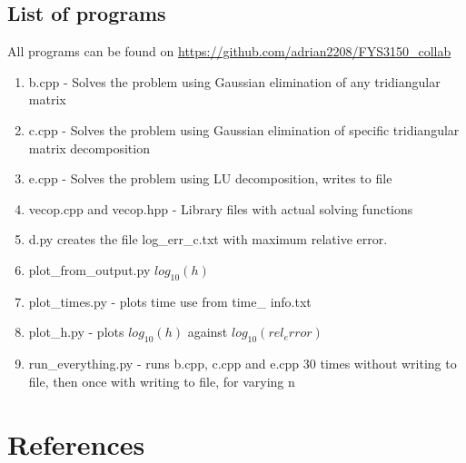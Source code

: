 \documentclass[10pt,a4paper]{article}
\begin{document}
\subsection{List of programs}
All programs can be found on \url{https://github.com/adrian2208/FYS3150_collab}
\begin{enumerate}
\item b.cpp - Solves the problem using Gaussian elimination of any tridiangular matrix
\item c.cpp - Solves the problem using Gaussian elimination of specific tridiangular matrix decomposition
\item e.cpp - Solves the problem using LU decomposition, writes to file
\item vecop.cpp and vecop.hpp - Library files with actual solving functions
\item d.py creates the file log\_err\_c.txt with maximum relative error.
\item plot\_from\_output.py $log_{10}(h)$
\item plot\_times.py - plots time use from time\_
info.txt
\item plot\_h.py - plots $log_{10}(h)$ against $log_{10}(rel_error)$
\item run\_everything.py - runs b.cpp, c.cpp and e.cpp 30 times without writing to file, then once with writing to file, for varying n
\end{enumerate}
\section{References}
 
\begin{thebibliography}{9}

\end{thebibliography}













\begin{comment}

$$
\begin{bmatrix}
0 & 0 & 0 & 0 \\
0 & 0 & 0 & 0 \\
0 & 0 & 0 & 0 \\
0 & 0 & 0 & 0 \\
\end{bmatrix}
$$

\begin{lstlisting}[caption=insert caption]
for (unsigned int i = 0; i<100;i++{
}
\end{lstlisting}

\begin{figure}[h]
\texttt{[image: ]}
\caption{include caption}
\end{figure}


HOW TO CITE SOURCES:
use
\cite{reference name}
in the text, and
\bibitem{reference name} 



\end{comment}
\end{document}
